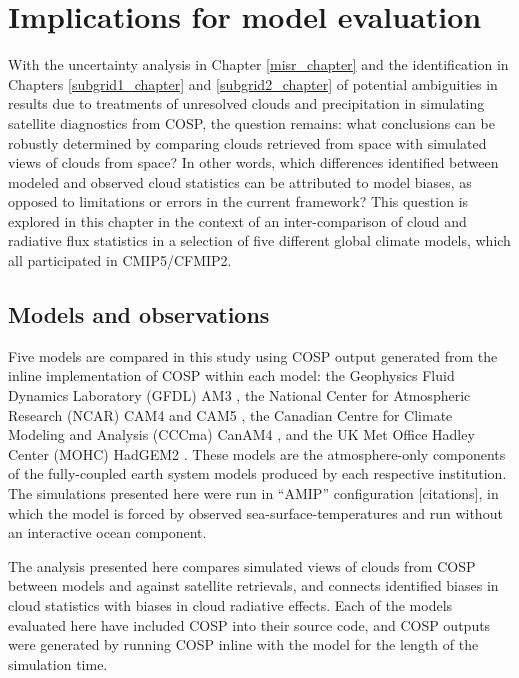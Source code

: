 \chapter{Implications for model evaluation}\label{cmip5_chapter}
With the uncertainty analysis in Chapter \ref{misr_chapter} and the identification in Chapters \ref{subgrid1_chapter} and \ref{subgrid2_chapter} of potential ambiguities in results due to treatments of unresolved clouds and precipitation in simulating satellite diagnostics from COSP, the question remains: what conclusions can be robustly determined by comparing clouds retrieved from space with simulated views of clouds from space? In other words, which differences identified between modeled and observed cloud statistics can be attributed to model biases, as opposed to limitations or errors in the current framework? This question is explored in this chapter in the context of an inter-comparison of cloud and radiative flux statistics in a selection of five different global climate models, which all participated in CMIP5/CFMIP2.

\section{Models and observations}
Five models are compared in this study using COSP output generated from the inline implementation of COSP within each model: the Geophysics Fluid Dynamics Laboratory (GFDL) AM3 \citep{donner_et_al_2011}, the National Center for Atmospheric Research (NCAR) CAM4 \citep{neale_et_al_2010a} and CAM5 \citep{neale_et_al_2010b}, the Canadian Centre for Climate Modeling and Analysis (CCCma) CanAM4 \citep{von_salzen_et_al_2012}, and the UK Met Office Hadley Center (MOHC) HadGEM2 \citep{martin_et_al_2011}. These models are the atmosphere-only components of the fully-coupled earth system models produced by each respective institution. The simulations presented here were run in ``AMIP'' configuration [citations], in which the model is forced by observed sea-surface-temperatures and run without an interactive ocean component.

The analysis presented here compares simulated views of clouds from COSP between models and against satellite retrievals, and connects identified biases in cloud statistics with biases in cloud radiative effects. Each of the models evaluated here have included COSP into their source code, and COSP outputs were generated by running COSP inline with the model for the length of the simulation time. 

